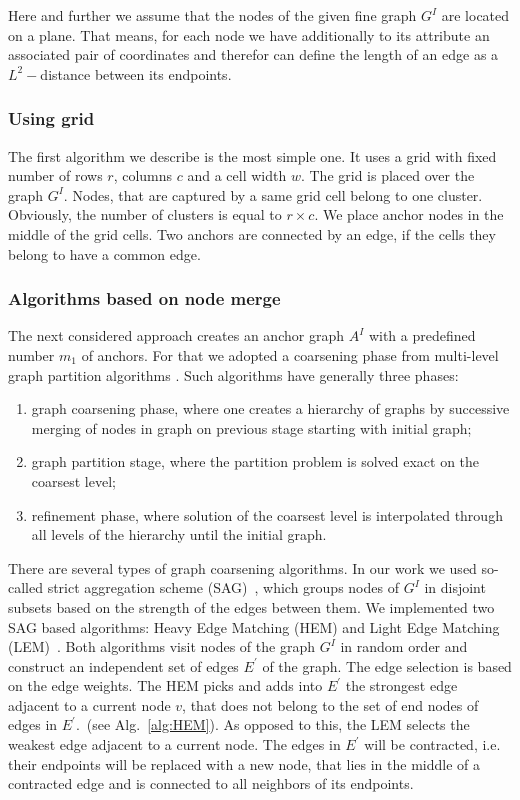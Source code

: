 Here and further we assume that the nodes of the given fine graph $G^I$ are located on a plane. That means, for each node we have additionally to its attribute an associated pair of coordinates and therefor can define the length of an edge as a $L^2-$distance between its endpoints.
\subsubsection{Using grid}	
The first algorithm we describe is the most simple one. It uses a grid with fixed number of rows $r$, columns $c$ and a cell width $w$. The grid is placed over the graph $G^I$. Nodes, that are captured by a same grid cell belong to one cluster. Obviously, the number of clusters is equal to $r\times c$. We place anchor nodes in the middle of the grid cells. Two anchors are connected by an edge, if the cells they belong to have a common edge.
\subsubsection{Algorithms based on node merge}
The next considered approach creates an anchor graph $A^I$ with a predefined number $m_1$ of anchors. For that we adopted a coarsening phase from multi-level graph partition algorithms \cite{Chevalier09_GP, Safro2012_GC, Karypis95_GP, Hendrickson1995}.
Such algorithms have generally three phases: 
\begin{enumerate}
	\item graph coarsening phase, where one creates a hierarchy of graphs by successive merging of nodes in graph on previous stage starting with initial graph;
	\item graph partition stage, where the partition problem is solved exact on the coarsest level;
	\item refinement phase, where solution of the coarsest level is interpolated through all levels of the hierarchy until the initial graph.
\end{enumerate}
There are several types of graph coarsening algorithms. In our work we used so-called strict aggregation scheme (SAG)~\cite{Chevalier09_GP}, which groups nodes of $G^I$ in disjoint subsets based on the strength of the edges between them. We implemented two SAG based algorithms: Heavy Edge Matching (HEM) and Light Edge Matching (LEM)~\cite{Chevalier09_GP}. Both algorithms visit nodes of the graph $G^I$ in random order and construct an independent set of edges $E^\prime$ of the graph. The edge selection is based on the edge weights. The HEM picks and adds into $E^\prime$ the strongest edge adjacent to a current node $v$, that does not belong to the set of end nodes of edges in $E^\prime$.~(see Alg.~\ref{alg:HEM}). As opposed to this, the LEM selects the weakest edge adjacent to a current node. The edges in $E^\prime$ will be contracted, i.e. their endpoints will be replaced with a new node, that lies in the middle of a contracted edge and is connected to all neighbors of its endpoints.

